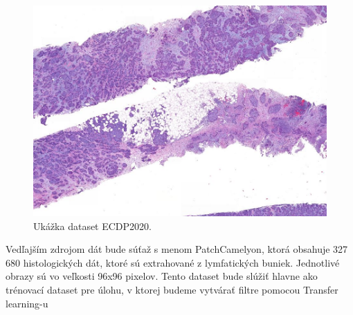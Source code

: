 \begin{figure}[h!]
\begin{centering}
\includegraphics[width=15cm]{assets/images/300_1.JPG}
\par\end{centering}
\caption{Ukážka dataset ECDP2020. \label{fig:dataseUkazka}\cite{ECDP2020}}
\end{figure}

\hspace{10mm}Vedľajším zdrojom dát bude súťaž s menom PatchCamelyon, ktorá obsahuje 327 680 histologických dát, ktoré sú extrahované z lymfatických buniek. Jednotlivé obrazy sú vo veľkosti 96x96 pixelov. Tento dataset bude slúžiť hlavne ako trénovací dataset pre úlohu, v ktorej budeme vytvárať filtre pomocou Transfer learning-u






